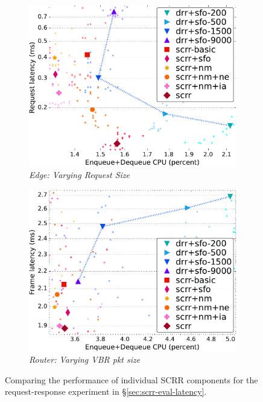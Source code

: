 \begin{figure}[t]
\begin{subfigure}[t]{.45\linewidth}
    \label{fig:component-resp-lat}
  \end{subfigure}
  \begin{subfigure}[t]{.45\linewidth}
    \centering
    \includegraphics[width=1\linewidth]{figs/pkt_size_edge_cn_2t1x32_mn_2tb1x8_mss_1468_kp_lat_comp_sfonmneia.pdf}
    \caption{\small{\textit{Edge: Varying Request Size}}}
    \label{fig:component-edge-cpu-lat}
  \end{subfigure}
  \begin{subfigure}[t]{.45\linewidth}
    \centering
    \includegraphics[width=1\linewidth]{figs/pkt_size_cn_2t4x16_mn_2ui32_mss_1468_kp_lat_comp_sfonmneia.pdf}
    \caption{\small{\textit{Router: Varying VBR pkt size}}}
    \label{fig:component-vbr-cpu-lat}
  \end{subfigure}
  \vspace{-3mm}
  \caption{\small{Comparing the performance of individual SCRR components for the request-response experiment in \S\ref{sec:scrr-eval-latency}.}}
  \label{fig:scrr-component}
  \vspace{-0.2cm}
\end{figure}
